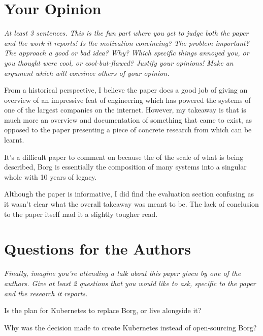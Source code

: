 \documentclass[11pt]{article}
\begin{document}
\section*{Your Opinion}

\textsl{At least 3 sentences. This is the fun part where you get to judge both
the paper and the work it reports! Is the motivation convincing? The problem
important? The approach a good or bad idea? Why? Which specific things annoyed
you, or you thought were cool, or cool-but-flawed? Justify your opinions! Make
an argument which will convince others of your opinion.}

From a historical perspective, I believe the paper does a good job of giving an
overview of an impressive feat of engineering which has powered the systems of
one of the largest companies on the internet. However, my takeaway is that is
much more an overview and documentation of something that came to exist, as
opposed to the paper presenting a piece of concrete research from which can
be learnt.

It's a difficult paper to comment on because the of the scale of what is being
described, Borg is essentially the composition of many systems into a singular
whole with 10 years of legacy.

Although the paper is informative, I did find the evaluation section confusing
as it wasn't clear what the overall takeaway was meant to be. The lack of
conclusion to the paper itself mad it a slightly tougher read.

\section*{Questions for the Authors}

\textsl{Finally, imagine you're attending a talk about this paper given by one
of the authors. Give at least 2 questions that you would like to ask, specific
to the paper and the research it reports.}

Is the plan for Kubernetes to replace Borg, or live alongside it?

Why was the decision made to create Kubernetes instead of open-sourcing Borg?




\end{document}
